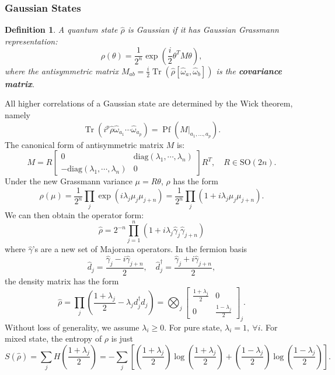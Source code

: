 \documentclass[aps,prx,superscriptaddress,nofootinbib]{revtex4}
\def \Tr{\operatorname{Tr}}
\newtheorem{definition}{Definition}
\begin{document}
\subsubsection{Gaussian States}

\begin{definition}
A quantum state $\hat \rho$ is Gaussian if it has Gaussian Grassmann representation:
$$\rho(\theta)=\frac{1}{2^{n}}\exp\left(\frac{i}{2}\theta^{T}M\theta\right),$$
where the antisymmetric matrix $M_{ab}=\frac{i}{2}\Tr(\hat \rho[\hat \omega_a,\hat\omega_b])$ is the \textbf{covariance matrix}.
\end{definition}
All higher correlations of a Gaussian state are determined by the Wick theorem, namely
$$
\Tr(i^p\hat\rho\hat\omega_{a_1}\cdots\hat\omega_{a_p})=\operatorname{Pf}(M|_{a_1,\dots,a_p}).
$$
The canonical form of antisymmetric matrix $M$ is:
$$
M = R \begin{bmatrix}
	0 & \mathrm{diag}(\lambda_1,\cdots,\lambda_n) \\ 
	-\mathrm{diag}(\lambda_1,\cdots,\lambda_n) & 0
\end{bmatrix} R^T, \quad
R \in \mathrm{SO}(2n).
$$
Under the new Grassmann variance $\mu = R\theta$, $\rho$ has the form
\begin{equation}
	\rho(\mu)
	=\frac{1}{2^{n}}\prod_{j}\exp\left(i\lambda_j\mu_{j} \mu_{j+n}\right)
	=\frac{1}{2^{n}}\prod_{j}\left(1+i\lambda_{j} \mu_{j} \mu_{j+n}\right).
\end{equation}
We can then obtain the operator form: 
\begin{equation}
	\hat\rho = 2^{-n} \prod_{j=1}^n(1+i\lambda_j \hat\gamma_j\hat\gamma_{j+n})
\end{equation}
where $\hat \gamma$'s are a new set of Majorana operators. In the fermion basis
\begin{equation}
	\hat d_j = \frac{\hat\gamma_j - i \hat\gamma_{j+n}}{2},\quad
	\hat d_j^\dagger = \frac{\hat\gamma_j + i \hat\gamma_{j+n}}{2},
\end{equation}
the density matrix has the form
\begin{equation}\label{eq:gaussian-std-form}
	\hat\rho
	= \prod_{j}\left(\frac{1+\lambda_j}{2}-\lambda_{j}d_{j}^{\dagger}d_{j}\right) 
	=\bigotimes_j \begin{bmatrix}
		\frac{1+\lambda_j}{2} & 0 \\
		0 & \frac{1-\lambda_j}{2}
	\end{bmatrix}_j.
\end{equation}
Without loss of generality, we assume $\lambda_i \ge 0$. For pure state, $\lambda_i =1,\ \forall i$.
For mixed state, the entropy of $\rho$ is just 
\begin{equation}
	S(\hat\rho)=\sum_j H\left(\frac{1+\lambda_j}{2}\right)
	= -\sum_j \left[\left(\frac{1+\lambda_j}{2}\right)\log\left(\frac{1+\lambda_j}{2}\right)+\left(\frac{1-\lambda_j}{2}\right)\log\left(\frac{1-\lambda_j}{2}\right)\right].
\end{equation}
\end{document}
